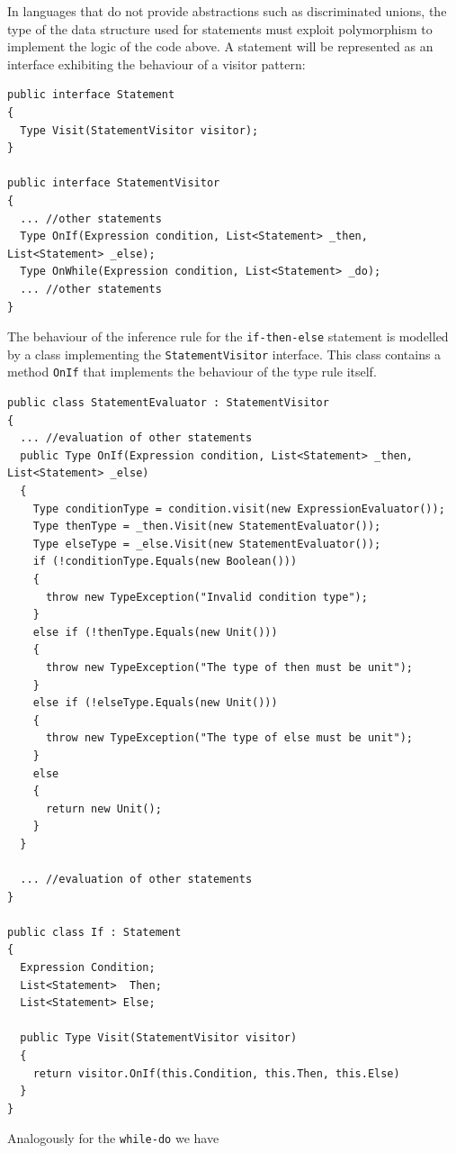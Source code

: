In languages that do not provide abstractions such as discriminated unions, the type of the data structure used for statements must exploit polymorphism to implement the logic of the code above. A statement will be represented as an interface exhibiting the behaviour of a visitor pattern:

\begin{lstlisting}
public interface Statement
{
  Type Visit(StatementVisitor visitor);
}

public interface StatementVisitor
{
  ... //other statements
  Type OnIf(Expression condition, List<Statement> _then, List<Statement> _else);
  Type OnWhile(Expression condition, List<Statement> _do);
  ... //other statements
}
\end{lstlisting}

The behaviour of the inference rule for the \texttt{if-then-else} statement is modelled by a class implementing the \texttt{StatementVisitor} interface. This class contains a method \texttt{OnIf} that implements the behaviour of the type rule itself. 

\begin{lstlisting}
public class StatementEvaluator : StatementVisitor
{
  ... //evaluation of other statements
  public Type OnIf(Expression condition, List<Statement> _then, List<Statement> _else)
  {
    Type conditionType = condition.visit(new ExpressionEvaluator());
    Type thenType = _then.Visit(new StatementEvaluator());
    Type elseType = _else.Visit(new StatementEvaluator());
    if (!conditionType.Equals(new Boolean()))
    {
      throw new TypeException("Invalid condition type");
    }
    else if (!thenType.Equals(new Unit()))
    {
      throw new TypeException("The type of then must be unit");
    }
    else if (!elseType.Equals(new Unit()))
    {
      throw new TypeException("The type of else must be unit");
    }
    else
    {
      return new Unit();
    }
  }
  
  ... //evaluation of other statements
}

public class If : Statement
{
  Expression Condition;
  List<Statement>  Then;
  List<Statement> Else;
  
  public Type Visit(StatementVisitor visitor)
  {
    return visitor.OnIf(this.Condition, this.Then, this.Else)
  }
}
\end{lstlisting}

Analogously for the \texttt{while-do} we have

